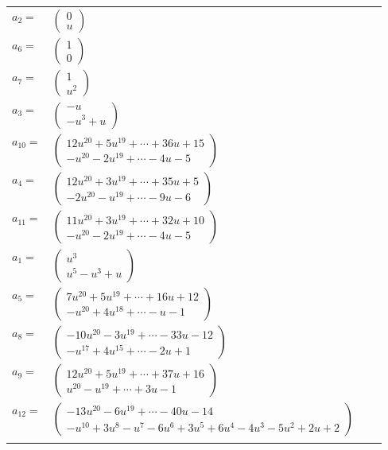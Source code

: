 \documentclass[1p]{elsarticle_modified}
\theoremstyle{definition}
\begin{document}
\begin{tabular}{m{7pt} m{180pt} m{7pt} m{180pt} }
\flushright $a_{2}=$&$\begin{pmatrix}0\\u\end{pmatrix}$ \\
\flushright $a_{6}=$&$\begin{pmatrix}1\\0\end{pmatrix}$ \\
\flushright $a_{7}=$&$\begin{pmatrix}1\\u^2\end{pmatrix}$ \\
\flushright $a_{3}=$&$\begin{pmatrix}- u\\- u^3+u\end{pmatrix}$ \\
\flushright $a_{10}=$&$\begin{pmatrix}12 u^{20}+5 u^{19}+\cdots+36 u+15\\- u^{20}-2 u^{19}+\cdots-4 u-5\end{pmatrix}$ \\
\flushright $a_{4}=$&$\begin{pmatrix}12 u^{20}+3 u^{19}+\cdots+35 u+5\\-2 u^{20}- u^{19}+\cdots-9 u-6\end{pmatrix}$ \\
\flushright $a_{11}=$&$\begin{pmatrix}11 u^{20}+3 u^{19}+\cdots+32 u+10\\- u^{20}-2 u^{19}+\cdots-4 u-5\end{pmatrix}$ \\
\flushright $a_{1}=$&$\begin{pmatrix}u^3\\u^5- u^3+u\end{pmatrix}$ \\
\flushright $a_{5}=$&$\begin{pmatrix}7 u^{20}+5 u^{19}+\cdots+16 u+12\\- u^{20}+4 u^{18}+\cdots- u-1\end{pmatrix}$ \\
\flushright $a_{8}=$&$\begin{pmatrix}-10 u^{20}-3 u^{19}+\cdots-33 u-12\\- u^{17}+4 u^{15}+\cdots-2 u+1\end{pmatrix}$ \\
\flushright $a_{9}=$&$\begin{pmatrix}12 u^{20}+5 u^{19}+\cdots+37 u+16\\u^{20}- u^{19}+\cdots+3 u-1\end{pmatrix}$ \\
\flushright $a_{12}=$&$\begin{pmatrix}-13 u^{20}-6 u^{19}+\cdots-40 u-14\\- u^{10}+3 u^8- u^7-6 u^6+3 u^5+6 u^4-4 u^3-5 u^2+2 u+2\end{pmatrix}$\\&\end{tabular}
\end{document}
